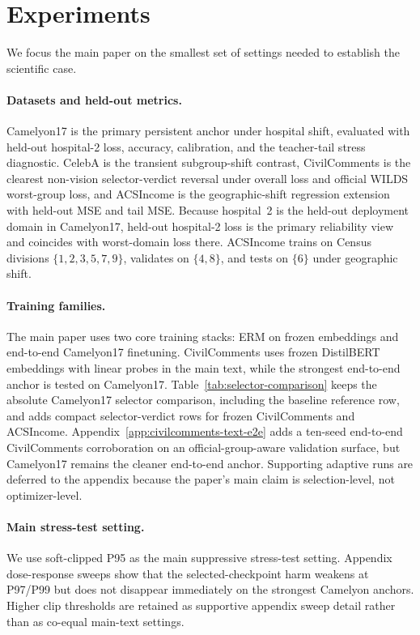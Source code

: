 \section{Experiments}
We focus the main paper on the smallest set of settings needed to establish the scientific case.

\paragraph{Datasets and held-out metrics.}
Camelyon17 is the primary persistent anchor under hospital shift, evaluated with held-out hospital-2 loss, accuracy, calibration, and the teacher-tail stress diagnostic.
CelebA is the transient subgroup-shift contrast, CivilComments is the clearest non-vision selector-verdict reversal under overall loss and official WILDS worst-group loss, and ACSIncome is the geographic-shift regression extension with held-out MSE and tail MSE.
Because hospital~2 is the held-out deployment domain in Camelyon17, held-out hospital-2 loss is the primary reliability view and coincides with worst-domain loss there.
ACSIncome trains on Census divisions $\{1,2,3,5,7,9\}$, validates on $\{4,8\}$, and tests on $\{6\}$ under geographic shift.

\paragraph{Training families.}
The main paper uses two core training stacks:
ERM on frozen embeddings and end-to-end Camelyon17 finetuning.
CivilComments uses frozen DistilBERT embeddings with linear probes in the main text, while the strongest end-to-end anchor is tested on Camelyon17.
Table~\ref{tab:selector-comparison} keeps the absolute Camelyon17 selector comparison, including the baseline reference row, and adds compact selector-verdict rows for frozen CivilComments and ACSIncome.
Appendix~\ref{app:civilcomments-text-e2e} adds a ten-seed end-to-end CivilComments corroboration on an official-group-aware validation surface, but Camelyon17 remains the cleaner end-to-end anchor.
Supporting adaptive runs are deferred to the appendix because the paper's main claim is selection-level, not optimizer-level.

\paragraph{Main stress-test setting.}
We use soft-clipped P95 as the main suppressive stress-test setting.
Appendix dose-response sweeps show that the selected-checkpoint harm weakens at P97/P99 but does not disappear immediately on the strongest Camelyon anchors.
Higher clip thresholds are retained as supportive appendix sweep detail rather than as co-equal main-text settings.

